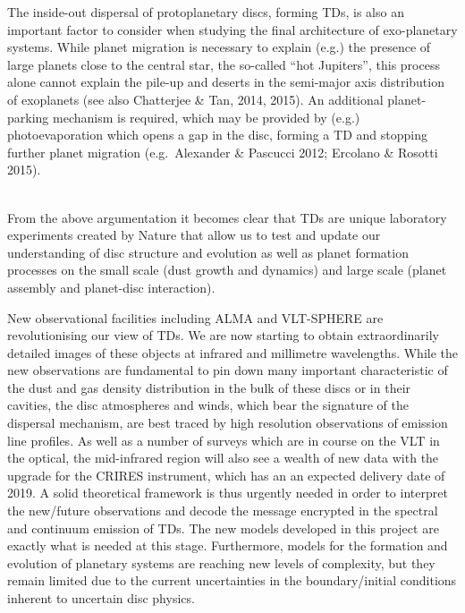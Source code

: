 \documentclass[12pt]{article}
\begin{document}
 The inside-out dispersal of
protoplanetary discs, forming TDs, is also an important
factor to consider when studying the final architecture of
exo-planetary systems. While planet migration is necessary to explain
(e.g.) the presence of large planets close to the central star, the
so-called ``hot Jupiters'', this process alone cannot explain the pile-up and
deserts in the semi-major axis distribution of exoplanets (see also
Chatterjee \& Tan, 2014, 2015). An
additional planet-parking mechanism is required, which may be provided by (e.g.)
photoevaporation which opens a gap in the disc, forming a TD and
stopping further planet migration (e.g.\ Alexander \& Pascucci 2012; Ercolano \& Rosotti
2015).

\vspace{1em}
\\
%
 From the above argumentation it becomes clear that TDs are
  unique laboratory experiments created by Nature that allow us to test and
  update our understanding of disc structure and evolution as well as planet
  formation processes on the small scale (dust growth and dynamics) and
  large scale (planet assembly and planet-disc interaction). 

New observational facilities including ALMA and VLT-SPHERE are revolutionising our view of
TDs. We are now starting to obtain extraordinarily detailed images of these objects at infrared and
millimetre wavelengths. While the new observations are fundamental to pin down many important
characteristic of the dust and gas density distribution in the bulk of
these discs or in their cavities, the disc atmospheres and winds, which bear the signature of the dispersal mechanism, are
best traced by high resolution observations of emission line profiles. As well as a number of surveys
which are in course on the VLT in the optical, the mid-infrared region will also see a wealth of new
data with the upgrade for the CRIRES instrument, which has an an expected delivery date of 2019.
A solid theoretical framework is thus urgently needed in order to interpret the new/future
observations and decode the message encrypted in the spectral and continuum emission of
TDs. The new models developed in this project are exactly what is needed at this stage.
Furthermore, models for the formation and evolution of planetary systems are reaching new
levels of complexity, but they remain limited due to the current uncertainties in the boundary/initial
conditions inherent to uncertain disc physics.
\end{document}
